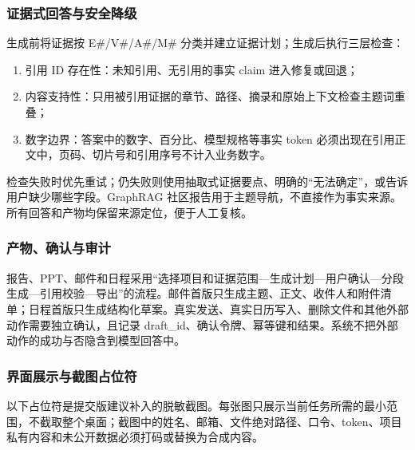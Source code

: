 \documentclass[UTF8,12pt]{ctexart}
\begin{document}
\subsubsection{证据式回答与安全降级}
生成前将证据按 E\#/V\#/A\#/M\# 分类并建立证据计划；生成后执行三层检查：
\begin{enumerate}
  \item 引用 ID 存在性：未知引用、无引用的事实 claim 进入修复或回退；
  \item 内容支持性：只用被引用证据的章节、路径、摘录和原始上下文检查主题词重叠；
  \item 数字边界：答案中的数字、百分比、模型规格等事实 token 必须出现在引用正文中，页码、切片号和引用序号不计入业务数字。
\end{enumerate}
检查失败时优先重试；仍失败则使用抽取式证据要点、明确的“无法确定”，或告诉用户缺少哪些字段。GraphRAG 社区报告用于主题导航，不直接作为事实来源。所有回答和产物均保留来源定位，便于人工复核。

\subsubsection{产物、确认与审计}
报告、PPT、邮件和日程采用“选择项目和证据范围—生成计划—用户确认—分段生成—引用校验—导出”的流程。邮件首版只生成主题、正文、收件人和附件清单；日程首版只生成结构化草案。真实发送、真实日历写入、删除文件和其他外部动作需要独立确认，且记录 draft\_id、确认令牌、幂等键和结果。系统不把外部动作的成功与否隐含到模型回答中。

\subsubsection{界面展示与截图占位符}
以下占位符是提交版建议补入的脱敏截图。每张图只展示当前任务所需的最小范围，不截取整个桌面；截图中的姓名、邮箱、文件绝对路径、口令、token、项目私有内容和未公开数据必须打码或替换为合成内容。



\end{document}
